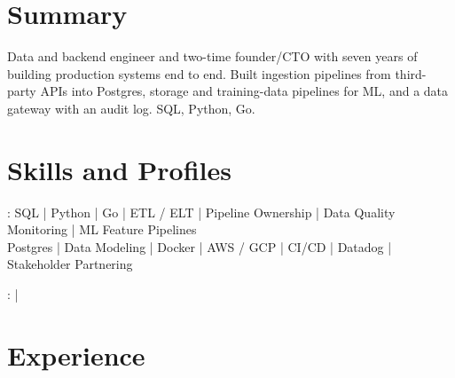 \documentclass[print]{jack-resume}
\begin{document}
\pagecolor{darkmodeBackground}


\begin{minipage}[t][1cm][t]{.03\textwidth}
    \hfill
\end{minipage}

\section{Summary}
Data and backend engineer and two-time founder/CTO with seven years of building production systems end to end. Built ingestion pipelines from third-party APIs into Postgres, storage and training-data pipelines for ML, and a data gateway with an audit log. SQL, Python, Go.
\sectionsep

\section{Skills and Profiles}
:
SQL \hfill | \hfill
Python \hfill | \hfill
Go \hfill | \hfill
ETL / ELT \hfill | \hfill
Pipeline Ownership \hfill | \hfill
Data Quality Monitoring \hfill | \hfill
ML Feature Pipelines \\
\hspace{1.0cm} Postgres \hfill | \hfill
Data Modeling \hfill | \hfill
Docker \hfill | \hfill
AWS / GCP \hfill | \hfill
CI/CD \hfill | \hfill
Datadog \hfill | \hfill
Stakeholder Partnering \\

\raggedright{
    :
      \href{https://www.linkedin.com/in/jack-sturtevant/}{ \ExternalLink} |
     \href{https://github.com/jacksturt}{ \ExternalLink}}

\section{Experience}
\end{document}

